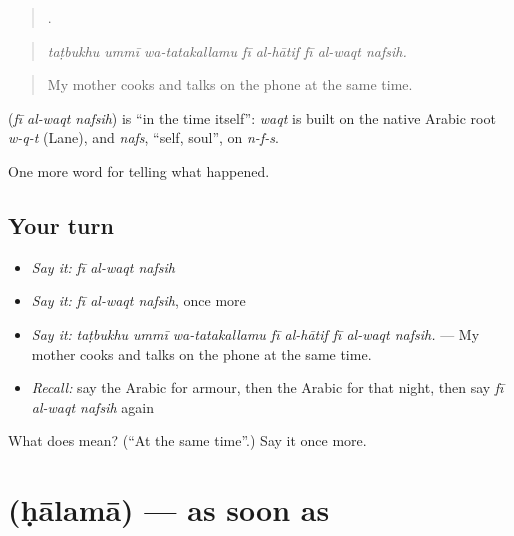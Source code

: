 \begin{quote}
       .
\end{quote}

\begin{quote}
\emph{taṭbukhu ummī wa-tatakallamu fī al-hātif fī al-waqt nafsih.}
\end{quote}

\begin{quote}
My mother cooks and talks on the phone at the same time.
\end{quote}

\begin{cousinweb}
\textbf{  } (\emph{fī al-waqt nafsih}) is \textquotedblleft{}in the time itself\textquotedblright{}: \emph{waqt} is built on the native Arabic root \emph{w-q-t} (Lane), and \emph{nafs}, \textquotedblleft{}self, soul\textquotedblright{}, on \emph{n-f-s}.
\end{cousinweb}

\begin{grammarlens}[title={What you've built}]
One more word for telling what happened.
\end{grammarlens}

\subsection*{Your turn}
\begin{itemize}
\raggedright
  \item \emph{Say it:} \emph{fī al-waqt nafsih}
  \item \emph{Say it:} \emph{fī al-waqt nafsih}, once more
  \item \emph{Say it:} \emph{taṭbukhu ummī wa-tatakallamu fī al-hātif fī al-waqt nafsih.} — My mother cooks and talks on the phone at the same time.
  \item \emph{Recall:} say the Arabic for armour, then the Arabic for that night, then say \emph{fī al-waqt nafsih} again
\end{itemize}

\begin{tcolorbox}[breakable,colback=teal!4,colframe=teal!35!black,title={Before you move on}]
What does    mean? (\textquotedblleft{}At the same time\textquotedblright{}.) Say it once more.
\end{tcolorbox}
\section[\texorpdfstring{\ar{حالما} (ḥālamā)}{حالما (ḥālamā)}]{ (ḥālamā) — as soon as}

